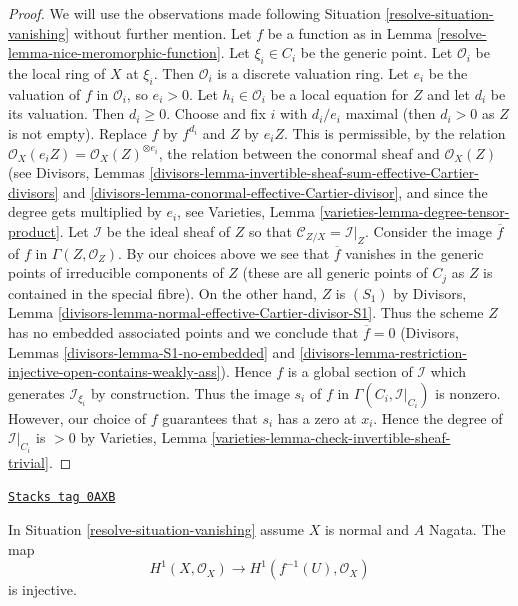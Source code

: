 \begin{proof}

We will use the observations made following Situation \ref{resolve-situation-vanishing}
without further mention. Let $f$ be a function as in
Lemma \ref{resolve-lemma-nice-meromorphic-function}.
Let $\xi_i \in C_i$ be the generic point. Let
$\mathcal{O}_i$ be the local ring of $X$ at $\xi_i$. Then $\mathcal{O}_i$
is a discrete valuation ring. Let $e_i$ be the valuation of
$f$ in $\mathcal{O}_i$, so $e_i > 0$. Let $h_i \in \mathcal{O}_i$ be a local
equation for $Z$ and let $d_i$ be its valuation. Then $d_i \geq 0$.
Choose and fix $i$ with $d_i/e_i$ maximal (then $d_i > 0$ as
$Z$ is not empty). Replace $f$ by $f^{d_i}$ and $Z$ by $e_iZ$.
This is permissible, by the relation
$\mathcal{O}_X(e_i Z) = \mathcal{O}_X(Z)^{\otimes e_i}$,
the relation between the conormal sheaf and $\mathcal{O}_X(Z)$
(see Divisors, Lemmas
\ref{divisors-lemma-invertible-sheaf-sum-effective-Cartier-divisors}
and \ref{divisors-lemma-conormal-effective-Cartier-divisor}, and
since the degree gets multiplied by $e_i$, see
Varieties, Lemma \ref{varieties-lemma-degree-tensor-product}.
Let $\mathcal{I}$ be the ideal sheaf of $Z$ so that
$\mathcal{C}_{Z/X} = \mathcal{I}|_Z$. Consider the image $\overline{f}$
of $f$ in $\Gamma(Z, \mathcal{O}_Z)$. By our choices above we see
that $\overline{f}$ vanishes in the generic points of irreducible
components of $Z$ (these are all generic points of $C_j$ as $Z$ is
contained in the special fibre). On the other hand, $Z$ is $(S_1)$ by
Divisors, Lemma \ref{divisors-lemma-normal-effective-Cartier-divisor-S1}.
Thus the scheme $Z$ has no embedded associated points and
we conclude that $\overline{f} = 0$ (Divisors, Lemmas
\ref{divisors-lemma-S1-no-embedded} and
\ref{divisors-lemma-restriction-injective-open-contains-weakly-ass}).
Hence $f$ is a global section of $\mathcal{I}$
which generates $\mathcal{I}_{\xi_i}$ by construction.
Thus the image $s_i$ of $f$ in $\Gamma(C_i, \mathcal{I}|_{C_i})$ is nonzero.
However, our choice of $f$ guarantees that $s_i$ has a zero at $x_i$.
Hence the degree of $\mathcal{I}|_{C_i}$ is $> 0$ by
Varieties, Lemma \ref{varieties-lemma-check-invertible-sheaf-trivial}.
\end{proof}

\begin{lemma}[H1 injective]
\label{resolve-lemma-H1-injective}
\href{https://stacks.math.columbia.edu/tag/0AXB}{\texttt{Stacks tag 0AXB}}

In Situation \ref{resolve-situation-vanishing} assume $X$ is normal
and $A$ Nagata. The map
$$
H^1(X, \mathcal{O}_X) \longrightarrow H^1(f^{-1}(U), \mathcal{O}_X)
$$
is injective.
\end{lemma}

